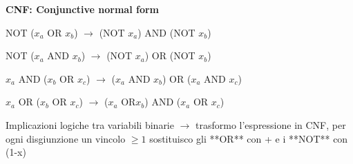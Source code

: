 \textbf{CNF: Conjunctive normal form}

NOT ($x_a$ OR $x_b$) $\rightarrow$ (NOT $x_a$) AND (NOT $x_b$)

NOT ($x_a$ AND $x_b$) $\rightarrow$ (NOT $x_a$) OR (NOT $x_b$)

$x_a$ AND ($x_b$ OR $x_c$) $\rightarrow$ ($x_a$ AND $x_b$) OR ($x_a$ AND $x_c$)

$x_a$ OR ($x_b$ OR $x_c$) $\rightarrow$ ($x_a$ OR$x_b$) AND ($x_a$ OR $x_c$)

Implicazioni logiche tra variabili binarie $\rightarrow$ trasformo l’espressione in CNF, 
per ogni disgiunzione un vincolo $\geqslant 1$ sostituisco gli **OR** con + e i **NOT** con (1-x)